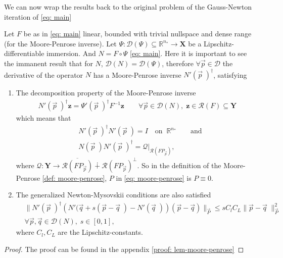 We can now wrap the results back to the original problem of the Gauss-Newton
iteration of \ref{eq: main}
\begin{lemma}
    \label{lem: moore-penrose}
    Let $F$ be as in \ref{eq: main} linear, bounded with trivial nullspace
    and dense range (for the Moore-Penrose inverse). Let $\Psi:
    \mathcal{D}(\Psi)\subseteq \mathbb{R}^{n_*} \to \mathbf{X}$ be a
    Lipschitz-differentiable immersion. And $N = F\circ \Psi$ \ref{eq: main}.
    Here it is important to see the immanent result that for $N$,
    $\mathcal{D}(N) = \mathcal{D}(\Psi)$, therefore $\forall \vec{p} \in
    \mathcal{D}$ the derivative of the operator $N$ has a Moore-Penrose
    inverse $N'(\vec{p}\;)^{\dagger}$, satisfying
    \begin{enumerate}
        \item The decomposition property of the Moore-Penrose inverse
            \begin{align}
                N'(\vec{p}\;)^{\dagger}\mathbf{z} =
                \Psi'(\vec{p}\;)^{\dagger}F^{-1}\mathbf{z} \qquad \forall
                \vec{p} \in \mathcal{D}(N),\; \mathbf{z} \in \mathcal{R}(F)
                \subseteq \mathbf{Y}
            \end{align}
            which means that
            \begin{align}
                &N'(\vec{p}\;)^{\dagger}N'(\vec{p}\;) = I \quad \text{on} \;\;
                \mathbb{R}^{n_*} \qquad \text{and}\\
                &N(\vec{p}\;)N'(\vec{p}\;)^{\dagger} =
                \mathcal{Q}|_{\mathcal{R}(FP_{\vec{p}})},
            \end{align}
            where $\mathcal{Q} : \mathbf{Y} \to
            \overline{\mathcal{R}(FP_{\vec{p}})}\dotplus\mathcal{R}(FP_{\vec{p}})^{\perp}$.
            So in the definition of the Moore-Penrose
            \ref{def: moore-penrose},
            $P$ in \ref{eq: moore-penrose} is $P \equiv 0$.
        \item The generalized Newton-Mysovskii conditions are also satisfied
            \begin{align}
                &\big\| N'(\vec{p}\;)^{\dagger}\left( N'(\vec{q} + s(\vec{p} -
                \vec{q}\;) - N'(\vec{q}\;)\right) (\vec{p} - \vec{q})
                \big\|_{\vec{P}}
                \leq s C_l C_L \|\vec{p} - \vec{q} \;\|^{2}_{\vec{P}}\\
                & \forall \vec{p}, \vec{q} \in \mathcal{D}(N), \; s \in[0,
                1],
            \end{align}
            where $C_l, C_L$ are the Lipschitz-constants.
    \end{enumerate}
\end{lemma}
\begin{proof}
    The proof can be found in the appendix \ref{proof: lem-moore-penrose}
\end{proof}

